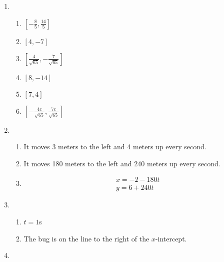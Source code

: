 \documentclass{article}
\begin{document}
\begin{enumerate}
\begin{enumerate}
	\end{enumerate}
	
\item
	
	\begin{enumerate}
	
	\item $[ -\frac{8}{5}, \frac{14}{5} ]$
	
	\item $[4, -7]$
	
	\item $[ \frac{4}{\sqrt{65}}, -\frac{7}{\sqrt{65}}]$
	
	\item $[8, -14]$
	
	\item $[7, 4]$
	
	\item $[-\frac{4c}{\sqrt{65}}, \frac{7c}{\sqrt{65}}]$
	
	\end{enumerate}
	
\item

	\begin{enumerate}
	
	\item It moves 3 meters to the left and 4 meters up every second.
	
	\item It moves 180 meters to the left and 240 meters up every second.
	
	\item
		\begin{gather*}
		x = -2 - 180t \\
		y = 6 + 240t
		\end{gather*}
	
	\end{enumerate}
	
\item

	\begin{enumerate}
	
	\item $t = 1$s
	
	\item The bug is on the line to the right of the $x$-intercept.
	
	\end{enumerate}

\item

	\begin{enumerate}
	

\end{enumerate}
\end{enumerate}
\end{document}
